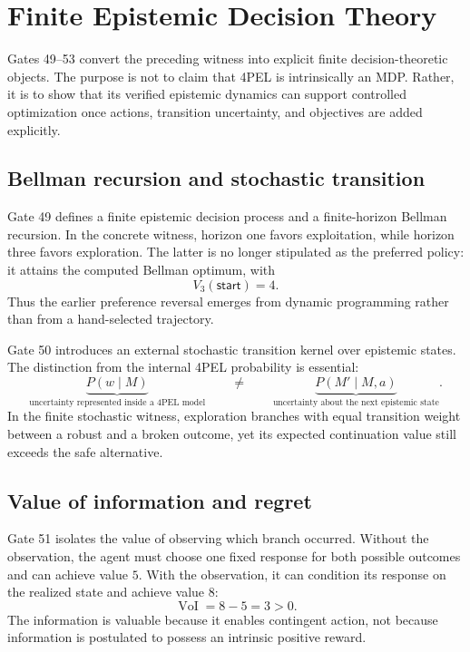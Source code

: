 \section{Finite Epistemic Decision Theory}

Gates 49--53 convert the preceding witness into explicit finite decision-theoretic objects. The purpose is not to claim that 4PEL is intrinsically an MDP. Rather, it is to show that its verified epistemic dynamics can support controlled optimization once actions, transition uncertainty, and objectives are added explicitly.

\subsection{Bellman recursion and stochastic transition}

Gate 49 defines a finite epistemic decision process and a finite-horizon Bellman recursion. In the concrete witness, horizon one favors exploitation, while horizon three favors exploration. The latter is no longer stipulated as the preferred policy: it attains the computed Bellman optimum, with
\[
V_3(\textsf{start})=4.
\]
Thus the earlier preference reversal emerges from dynamic programming rather than from a hand-selected trajectory.

Gate 50 introduces an external stochastic transition kernel over epistemic states. The distinction from the internal 4PEL probability is essential:
\[
\underbrace{P(w\mid M)}_{\text{uncertainty represented inside a 4PEL model}}
\qquad\neq\qquad
\underbrace{P(M'\mid M,a)}_{\text{uncertainty about the next epistemic state}}.
\]
In the finite stochastic witness, exploration branches with equal transition weight between a robust and a broken outcome, yet its expected continuation value still exceeds the safe alternative.

\subsection{Value of information and regret}

Gate 51 isolates the value of observing which branch occurred. Without the observation, the agent must choose one fixed response for both possible outcomes and can achieve value $5$. With the observation, it can condition its response on the realized state and achieve value $8$:
\[
\operatorname{VoI}=8-5=3>0.
\]
The information is valuable because it enables contingent action, not because information is postulated to possess an intrinsic positive reward.

